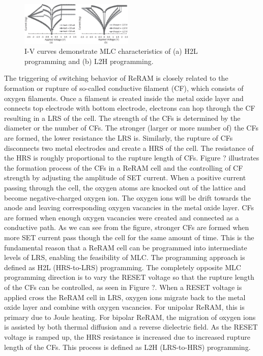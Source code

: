 \begin{figure}[t]
\centering
\includegraphics[width=0.48\textwidth]{fig/i-v}
\vspace{-10pt}
\caption{I-V curves demonstrate MLC characteristics of (a) H2L programming and (b) L2H programming.}
\label{fig:memristor}
\vspace{-15pt}
\end{figure}

The triggering of switching behavior of ReRAM is closely related to the formation or rupture of so-called conductive filament (CF), which consists of oxygen filaments. Once a filament is created inside the metal oxide layer and connects top electrode with bottom electrode, electrons can hop through the CF resulting in a LRS of the cell. The strength of the CFs is determined by the diameter or the number of CFs. The stronger (larger or more number of) the CFs are formed, the lower resistance the LRS is. Similarly, the rupture of CFs disconnects two metal electrodes and create a HRS of the cell. The resistance of the HRS is roughly proportional to the rupture length of CFs. Figure ? illustrates the formation process of the CFs in a ReRAM cell and the controlling of CF strength by adjusting the amplitude of SET current. When a positive current passing through the cell, the oxygen atoms are knocked out of the lattice and become negative-charged oxygen ion. The oxygen ions will be drift towards the anode and leaving corresponding oxygen vacancies in the metal oxide layer. CFs are formed when enough oxygen vacancies were created and connected as a conductive path. As we can see from the figure, stronger CFs are formed when more SET current pass though the cell for the same amount of time. This is the fundamental reason that a ReRAM cell can be programmed into intermediate levels of LRS, enabling the feasibility of MLC. The programming approach is defined as H2L (HRS-to-LRS) programming. The completely opposite MLC programming direction is to vary the RESET voltage so that the rupture length of the CFs can be controlled, as seen in Figure ?. When a RESET voltage is applied cross the ReRAM cell in LRS, oxygen ions migrate back to the metal oxide layer and combine with oxygen vacancies. For unipolar ReRAM, this is primary due to Joule heating. For bipolar ReRAM, the migration of oxygen ions is assisted by both thermal diffusion and a reverse dielectric field. As the RESET voltage is ramped up, the HRS resistance is increased due to increased rupture length of the CFs. This process is defined as L2H (LRS-to-HRS) programming.

